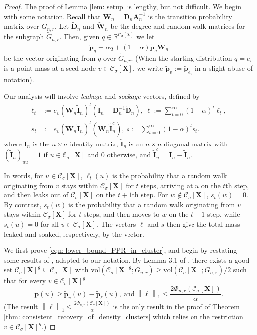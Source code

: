 \documentclass{article}
\let\pprspace\relax
\newcommand{\vol}{\mathrm{vol}}
\newcommand{\Reals}{\mathbb{R}}
\newcommand{\norm}[1]{\left\lVert#1\right\rVert}
\newcommand{\1}{\mathbf{1}}
\newcommand{\pbf}{\mathbf{p}}
\newcommand{\Abf}{\mathbf{A}}
\newcommand{\Xbf}{\mathbf{X}}
\newcommand{\Wbf}{\mathbf{W}}
\newcommand{\Dbf}{\mathbf{D}}
\newcommand{\Cset}{\mathcal{C}}
\newcommand{\Csig}{\Cset_{\sigma}}
\newcommand{\pprspace}{{\sc PPR~}}
\newcommand{\wDbf}{\widetilde{\Dbf}}
\theoremstyle{aldenthm}
\begin{document}
\begin{proof}
	The proof of Lemma \ref{lem: setup} is lengthy, but not difficult. We begin with some notation. Recall that $\Wbf_n = \Dbf_n \Abf_n^{-1}$ is the transition probability matrix over $G_{n,r}$. Let $\widetilde{\Dbf}_n$ and $\widetilde{\Wbf}_n$ be the degree and random walk matrices for the subgraph $\widetilde{G}_{n,r}$. Then, given $q \in \Reals^{\Csig[\Xbf]}$ we let
	\begin{equation}
	\widetilde{\pbf}_q = \alpha q + (1 - \alpha) \widetilde{\pbf}_{q} \widetilde{\Wbf}_n 
	\end{equation}
	be the \pprspace vector originating from $q$ over $\widetilde{G}_{n,r}$. (When the starting distribution $q = e_v$ is a point mass at a seed node $v \in \Csig[\Xbf]$, we write $\widetilde{\pbf}_v := \widetilde{\pbf}_{e_v}$ in a slight abuse of notation).
	
	Our analysis will involve \emph{leakage} and \emph{soakage} vectors, defined by
	\begin{align}
	\label{eqn: leakage_soakage}
	\ell_t & := e_v (\Wbf_n \widetilde{\mathbf{I}}_n )^t (\mathbf{I}_n - \Dbf_n^{-1} \wDbf_{n}),~ \ell := \sum_{t = 0}^{\infty} (1 - \alpha)^t \ell_t, \nonumber \\
	s_t & := e_v (\Wbf_n \widetilde{\mathbf{I}}_n )^t (\Wbf_n \widetilde{\mathbf{I}}_n^c),~ s := \sum_{t = 0}^{\infty} (1 - \alpha)^{t} s_t.
	\end{align}
	where $\mathbf{I}_n$ is the $n \times n$ identity matrix, $\widetilde{\mathbf{I}}_n$ is an $n \times n$ diagonal matrix with $(\widetilde{\mathbf{I}}_n)_{uu} = 1$ if $u \in \Csig[\Xbf]$ and $0$ otherwise, and $\widetilde{\mathbf{I}}_n^c = \mathbf{I}_n - \widetilde{\mathbf{I}}_n$.
	
	In words, for $u \in \Csig[\Xbf]$, $\ell_t(u)$ is the probability that a random walk originating from $v$ stays within $\Csig[\Xbf]$ for $t$ steps, arriving at $u$ on the $t$th step, and then leaks out of $\Csig[\Xbf]$ on the $t + 1$th step. For $w \not\in \Csig[\Xbf]$, $s_t(w) = 0$. By contrast, $s_t(w)$ is the probability that a random walk originating from $v$ stays within $\Csig[\Xbf]$ for $t$ steps, and then moves to $w$ on the $t + 1$ step, while $s_t(u) = 0$ for all $u \in \Csig[\Xbf]$. The vectors $\ell$ and $s$ then give the total mass leaked and soaked, respectively, by the \pprspace vector. 
	
	We first prove \eqref{eqn: lower_bound_PPR_in_cluster}, and begin by restating some results of \citep{zhu2013}, adapted to our notation. By Lemma 3.1 of \citep{zhu2013}, there exists a good set $\Csig[\Xbf]^g \subseteq \Csig[\Xbf]$ with $\vol(\Csig[\Xbf]^g; G_{n,r}) \geq \vol(\Csig[\Xbf]; G_{n,r})/2$ such that for every $v \in \Csig[\Xbf]^g$
	\begin{equation}
	\label{eqn: zhulemma3.1}
	\pbf(u) \geq \widetilde{\pbf}_v(u) - \widetilde{\pbf}_{\ell}(u),~ \textrm{and}~ \norm{\ell}_1 \leq \frac{2 \Phi_{n,r}(\Csig[\Xbf])}{\alpha}.
	\end{equation}
	(The result $\norm{\ell}_1 \leq \frac{2 \Phi_{n,r}(\Csig[\Xbf])}{\alpha}$ is the only result in the proof of Theorem \ref{thm: consistent_recovery_of_density_clusters} which relies on the restriction $v \in \Csig[\Xbf]^g$.)
	

\end{proof}
\end{document}
